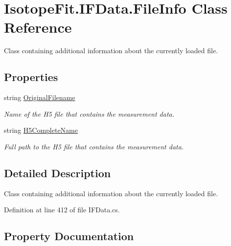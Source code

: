 \hypertarget{class_isotope_fit_1_1_i_f_data_1_1_file_info}{}\section{Isotope\+Fit.\+I\+F\+Data.\+File\+Info Class Reference}
\label{class_isotope_fit_1_1_i_f_data_1_1_file_info}


Class containing additional information about the currently loaded file.  


\subsection*{Properties}
\begin{DoxyCompactItemize}
\item 
string \hyperlink{class_isotope_fit_1_1_i_f_data_1_1_file_info_a465af980a8c2f2a971d213e328b5932c}{Original\+Filename}
\begin{DoxyCompactList}\small\item\em Name of the H5 file that contains the measurement data. \end{DoxyCompactList}\item 
string \hyperlink{class_isotope_fit_1_1_i_f_data_1_1_file_info_a3c352cd3b905abe1210e97cc24be0b88}{H5\+Complete\+Name}
\begin{DoxyCompactList}\small\item\em Full path to the H5 file that contains the measurement data. \end{DoxyCompactList}\end{DoxyCompactItemize}


\subsection{Detailed Description}
Class containing additional information about the currently loaded file. 



Definition at line 412 of file I\+F\+Data.\+cs.



\subsection{Property Documentation}
\mbox{\label{class_isotope_fit_1_1_i_f_data_1_1_file_info_a3c352cd3b905abe1210e97cc24be0b88}} 
